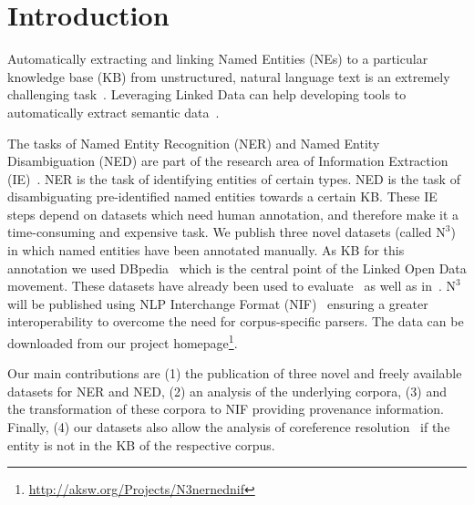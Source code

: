 \section{Introduction}

Automatically extracting and linking Named Entities (NEs) to a particular knowledge base (KB) from unstructured, natural language text is an extremely challenging task~\cite{Cucerzan07}. 
Leveraging Linked Data can help developing tools to automatically extract semantic data~\cite{GER+13,AIDA,spotlight,Usbeck2013}.

The tasks of Named Entity Recognition (NER) and Named Entity Disambiguation (NED) are part of the research area of Information Extraction (IE)~\cite{FOX}.
NER is the task of identifying entities of certain types.
NED is the task of disambiguating pre-identified named entities towards a certain KB.
These IE steps depend on datasets which need human annotation, and therefore make it a time-consuming and expensive task.
We publish three novel datasets (called $\mbox{N}^3$) in which named entities have been annotated manually. As KB for this annotation we used DBpedia~\cite{dbpedia_iswc} which is the central point of the Linked Open Data movement. These datasets have already been used to evaluate~\cite{AIDA,spotlight} as well as in~\cite{GER+13,Usbeck2013}.
$\mbox{N}^3$ will be published using NLP Interchange Format (NIF)~\cite{ISWC2013NIF} ensuring a greater interoperability to overcome the need for corpus-specific parsers. 
The data can be downloaded from our project homepage\footnote{\url{http://aksw.org/Projects/N3nernednif}}.

Our main contributions are
(1) the publication of three novel and freely available datasets for NER and NED,
(2) an analysis of the underlying corpora,
(3) and the transformation of these corpora to NIF providing provenance information.
Finally, (4) our datasets also allow the analysis of coreference resolution~\cite{singh} if the entity is not in the KB of the respective corpus.

